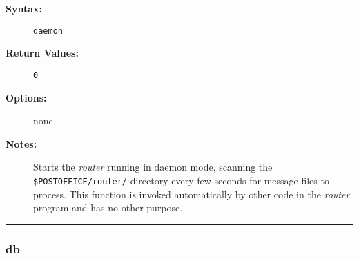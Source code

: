 \begin{description}
\item[{\bf Syntax:}] \mbox{}

{\tt daemon}

\item[{\bf Return Values:}] \mbox{}

\begin{description}
\item[{\tt 0}] \mbox{}



\end{description}


\item[{\bf Options:}] \mbox{}

none  

\item[{\bf Notes:}] \mbox{}

Starts the {\em router\/} running in daemon mode, 
scanning the {\tt \$POSTOFFICE/router/} directory every few 
seconds for message files to process. This function is invoked 
automatically by other code in the {\em router\/} program and has no 
other purpose.

\end{description}


\hrule
\subsubsection{db}

